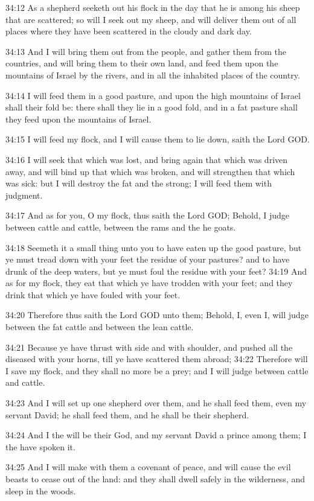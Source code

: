 34:12 As a shepherd seeketh out his flock in the day that he is among his sheep that are scattered; so will I seek out my sheep, and will deliver them out of all places where they have been scattered in the cloudy and dark day.

34:13 And I will bring them out from the people, and gather them from the countries, and will bring them to their own land, and feed them upon the mountains of Israel by the rivers, and in all the inhabited places of the country.

34:14 I will feed them in a good pasture, and upon the high mountains of Israel shall their fold be: there shall they lie in a good fold, and in a fat pasture shall they feed upon the mountains of Israel.

34:15 I will feed my flock, and I will cause them to lie down, saith the Lord GOD.

34:16 I will seek that which was lost, and bring again that which was driven away, and will bind up that which was broken, and will strengthen that which was sick: but I will destroy the fat and the strong; I will feed them with judgment.

34:17 And as for you, O my flock, thus saith the Lord GOD; Behold, I judge between cattle and cattle, between the rams and the he goats.

34:18 Seemeth it a small thing unto you to have eaten up the good pasture, but ye must tread down with your feet the residue of your pastures? and to have drunk of the deep waters, but ye must foul the residue with your feet?  34:19 And as for my flock, they eat that which ye have trodden with your feet; and they drink that which ye have fouled with your feet.

34:20 Therefore thus saith the Lord GOD unto them; Behold, I, even I, will judge between the fat cattle and between the lean cattle.

34:21 Because ye have thrust with side and with shoulder, and pushed all the diseased with your horns, till ye have scattered them abroad; 34:22 Therefore will I save my flock, and they shall no more be a prey; and I will judge between cattle and cattle.

34:23 And I will set up one shepherd over them, and he shall feed them, even my servant David; he shall feed them, and he shall be their shepherd.

34:24 And I the \LORD will be their God, and my servant David a prince among them; I the \LORD have spoken it.

34:25 And I will make with them a covenant of peace, and will cause the evil beasts to cease out of the land: and they shall dwell safely in the wilderness, and sleep in the woods.

